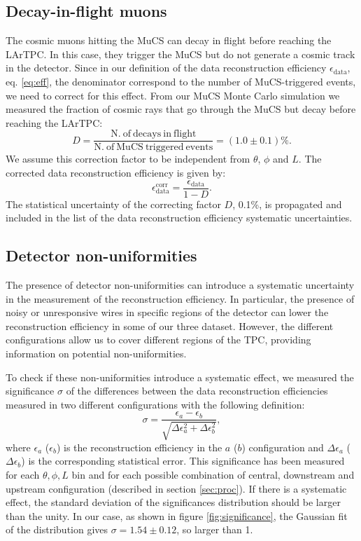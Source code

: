\documentclass[a4paper]{scrartcl}
\begin{document}
\subsection{Decay-in-flight muons}\label{sec:dif}
The cosmic muons hitting the MuCS can decay in flight before reaching the LArTPC. In this case, they trigger the MuCS but do not generate a cosmic track in the detector. Since in our definition of the data reconstruction efficiency $\epsilon_{\mathrm{data}}$, eq. \eqref{eq:eff}, the denominator correspond to the number of MuCS-triggered events, we need to correct for this effect. From our MuCS Monte Carlo simulation we measured the fraction of cosmic rays that go through the MuCS but decay before reaching the LArTPC:
\begin{equation}
D = \frac{\mathrm{N.~of~decays~in~flight}}{\mathrm{N.~of~MuCS~triggered~events}} = (1.0 \pm 0.1) \%.
\end{equation}
We assume this correction factor to be independent from $\theta$, $\phi$ and $L$. The corrected data reconstruction efficiency is given by:
\begin{equation}
\epsilon_{\mathrm{data}}^{\mathrm{corr}} =  \frac{\epsilon_{\mathrm{data}}}{1-D}.
\end{equation}
The statistical uncertainty of the correcting factor $D$, 0.1\%, is propagated and included in the list of the data reconstruction efficiency systematic uncertainties.

\subsection{Detector non-uniformities}\label{sec:wires}
The presence of detector non-uniformities can introduce a systematic uncertainty in the measurement of the reconstruction efficiency. In particular, the presence of noisy or unresponsive wires in specific regions of the detector can lower the reconstruction efficiency in some of our three dataset. However, the different configurations allow us to cover different regions of the TPC, providing information on potential non-uniformities.

To check if these non-uniformities introduce a systematic effect, we measured the significance $\sigma$ of the differences between the data reconstruction efficiencies measured in two different configurations with the following definition:
\begin{equation}
\sigma = \frac{\epsilon_a-\epsilon_b}{\sqrt{\Delta \epsilon_{a}^2 + \Delta \epsilon_b^2}},
\end{equation}
where $\epsilon_{a}$ ($\epsilon_{b}$) is the reconstruction efficiency in the $a$ ($b$) configuration and $\Delta \epsilon_{a}$ ($\Delta \epsilon_{b}$) is the corresponding statistical error. This significance has been measured for each $\theta,\phi,L$ bin and for each possible combination of central, downstream and upstream configuration (described in section \ref{sec:proc}). If there is a systematic effect, the standard deviation of the significances distribution should be larger than the unity. In our case, as shown in figure \ref{fig:significance}, the Gaussian fit of the distribution gives $\sigma = 1.54\pm0.12$, so larger than 1.
\end{document}
